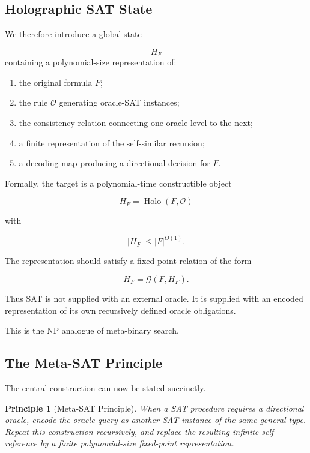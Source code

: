 \documentclass[11pt]{article}
\theoremstyle{plain}
\newtheorem{principle}[theorem]{Principle}
\theoremstyle{definition}
\begin{document}
\subsection{Holographic SAT State}

We therefore introduce a global state

\[
    H_F
\]
containing a polynomial-size representation of:

\begin{enumerate}
    \item the original formula \(F\);
    \item the rule \(\mathcal{O}\) generating oracle-SAT instances;
    \item the consistency relation connecting one oracle level to the next;
    \item a finite representation of the self-similar recursion;
    \item a decoding map producing a directional decision for \(F\).
\end{enumerate}

Formally, the target is a polynomial-time constructible object

\[
    H_F=\operatorname{Holo}(F,\mathcal{O})
\]

with

\[
    |H_F|\leq |F|^{O(1)}.
\]

The representation should satisfy a fixed-point relation of the form

\[
    H_F
    =
    \mathcal{G}(F,H_F).
\]

Thus SAT is not supplied with an external oracle.  It is supplied with an
encoded representation of its own recursively defined oracle obligations.

This is the NP analogue of meta-binary search.

\subsection{The Meta-SAT Principle}

The central construction can now be stated succinctly.

\begin{principle}[Meta-SAT Principle]
\label{principle:meta-sat}
When a SAT procedure requires a directional oracle, encode the oracle query as
another SAT instance of the same general type.  Repeat this construction
recursively, and replace the resulting infinite self-reference by a finite
polynomial-size fixed-point representation.
\end{principle}
\end{document}
